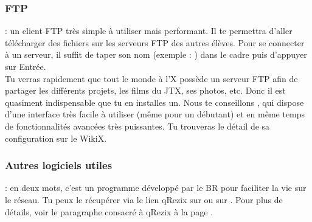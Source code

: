 \subsubsection{FTP}

  : un client FTP tr\`es simple \`a  utiliser mais performant. Il te permettra d'aller t\'el\'echarger des fichiers sur les serveurs FTP des autres \'el\`eves.
Pour se connecter \`a  un serveur, il suffit de taper son nom (exemple : ) dans le cadre  puis d'appuyer sur Entr\'ee.\\
Tu verras rapidement que tout le monde \`a  l'X poss\`ede un serveur FTP afin de partager les diff\'erents projets, les films du JTX, ses photos, etc. Donc il est quasiment indispensable que tu en installes un. Nous te conseillons , qui dispose d'une interface tr\`es facile \`a  utiliser (m\^eme pour un d\'ebutant) et en m\^eme temps de fonctionnalit\'es avanc\'ees tr\`es puissantes. Tu trouveras le d\'etail de sa configuration sur le WikiX.

\subsubsection{Autres logiciels utiles}

  : en deux mots, c'est un programme d\'evelopp\'e par le BR pour faciliter la vie sur le r\'eseau. Tu peux le r\'ecup\'erer via le lien qRezix sur  ou sur . Pour plus de d\'etails, voir le paragraphe consacr\'e \`a  qRezix \`a  la page \pageref{qrezix}. \\



